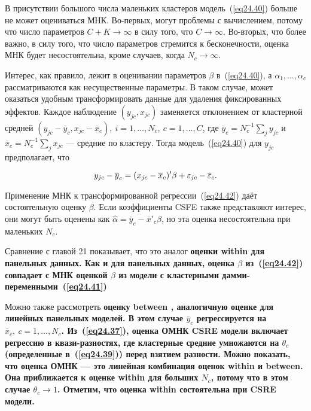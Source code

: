 В присутствии большого числа маленьких кластеров модель~(\ref{eq24.40}) больше не может оцениваться МНК. Во-первых, могут проблемы с вычислением, потому что число параметров $C+K \to \infty$ в силу того, что $C \to \infty$. Во-вторых, что более важно, в силу того, что число параметров стремится к бесконечности, оценка МНК будет несостоятельна, кроме случаев, когда $N_c \to \infty$. 

Интерес, как правило, лежит в оценивании параметров $\beta$ в~(\ref{eq24.40}), а $\alpha_1 , \dots, \alpha_c$ рассматриваются как несущественные параметры. В таком случае, может оказаться удобным трансформировать данные для удаления фиксированных эффектов. Каждое наблюдение $(y_{jc}, x_{jc})$ заменяется отклонением от кластерной средней $(y_{jc} - \overline{y}_c, x_{jc} - \overline{x}_c), \: i = 1, \dots, N_c, \: c = 1, \dots, C$, где $\overline{y}_c = N_c^{-1} \sum_j y_{jc}$ и $\overline{x}_c = N_c^{-1} \sum_j x_{jc}$ --- средние по кластеру. Тогда модель~(\ref{eq24.40}) для $y_{jc}$ предполагает, что

\begin{equation}
\label{eq24.42}
y_{jc} - \overline{y}_c = (x_{jc} - \overline{x}_c)' \beta + \varepsilon_{jc} - \overline{\varepsilon}_c.
\end{equation}

Применение МНК к трансформированной регрессии~(\ref{eq24.42}) даёт состоятельную оценку $\beta$. Если коэффициенты CSFE также представляют интерес, они могут быть оценены как $\hat \alpha = \overline{y}_c - \overline{x}'_c \beta$, но эта оценка несостоятельна при маленьких $N_c$. 

Сравнение с главой 21 показывает, что это аналог \bfseries оценки within \mdseries для панельных данных. Как и для панельных данных, оценка $\beta$ из~(\ref{eq24.42}) совпадает с МНК оценкой $\beta$ из модели с кластерными дамми-переменными~(\ref{eq24.41})

Можно также рассмотреть \bfseries оценку between \mdseries, аналогичную оценке для линейных панельных моделей. В этом случае $\overline{y}_c$ регрессируется на $\overline{x}_c, \: c = 1, \dots , N_c$. Из~(\ref{eq24.37}), оценка ОМНК CSRE модели включает регрессию в квази-разностях, где кластерные средние умножаются на $\theta_c$ (определенные в~(\ref{eq24.39})) перед взятием разности. Можно показать, что оценка ОМНК --- это линейная комбинация оценок within и between. Она приближается к оценке within для больших $N_c$, потому что в этом случае $\theta_c \to 1$. Отметим, что оценка within состоятельна при CSRE модели. 

